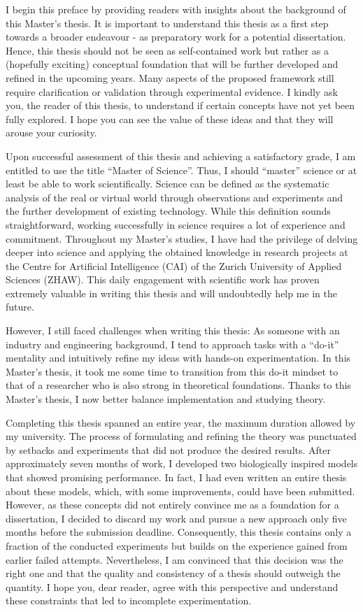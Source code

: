 \small
I begin this preface by providing readers with insights about the background of this Master's thesis.
It is important to understand this thesis as a first step towards a broader endeavour - as preparatory work for a potential dissertation.
Hence, this thesis should not be seen as self-contained work but rather as a (hopefully exciting) conceptual foundation that will be further developed and refined in the upcoming years.
Many aspects of the proposed framework still require clarification or validation through experimental evidence. I kindly ask you, the reader of this thesis, to understand if certain concepts have not yet been fully explored. I hope you can see the value of these ideas and that they will arouse your curiosity.

Upon successful assessment of this thesis and achieving a satisfactory grade, I am entitled to use the title ``Master of Science''.
Thus, I should ``master'' science or at least be able to work scientifically.
Science can be defined as the systematic analysis of the real or virtual world through observations and experiments and the further development of existing technology.
While this definition sounds straightforward, working successfully in science requires a lot of experience and commitment.
Throughout my Master's studies, I have had the privilege of delving deeper into science and applying the obtained knowledge in research projects at the Centre for Artificial Intelligence (CAI) of the Zurich University of Applied Sciences (ZHAW).
This daily engagement with scientific work has proven extremely valuable in writing this thesis and will undoubtedly help me in the future.

However, I still faced challenges when writing this thesis:
As someone with an industry and engineering background, I tend to approach tasks with a ``do-it'' mentality and intuitively refine my ideas with hands-on experimentation. 
In this Master's thesis, it took me some time to transition from this do-it mindset to that of a researcher who is also strong in theoretical foundations. Thanks to this Master's thesis, I now better balance implementation and studying theory.

Completing this thesis spanned an entire year, the maximum duration allowed by my university.
The process of formulating and refining the theory was punctuated by setbacks and experiments that did not produce the desired results.
After approximately seven months of work, I developed two biologically inspired models that showed promising performance. 
In fact, I had even written an entire thesis about these models, which, with some improvements, could have been submitted.
However, as these concepts did not entirely convince me as a foundation for a dissertation, I decided to discard my work and pursue a new approach only five months before the submission deadline.
Consequently, this thesis contains only a fraction of the conducted experiments but builds on the experience gained from earlier failed attempts.
Nevertheless, I am convinced that this decision was the right one and that the quality and consistency of a thesis should outweigh the quantity.
I hope you, dear reader, agree with this perspective and understand these constraints that led to incomplete experimentation.

